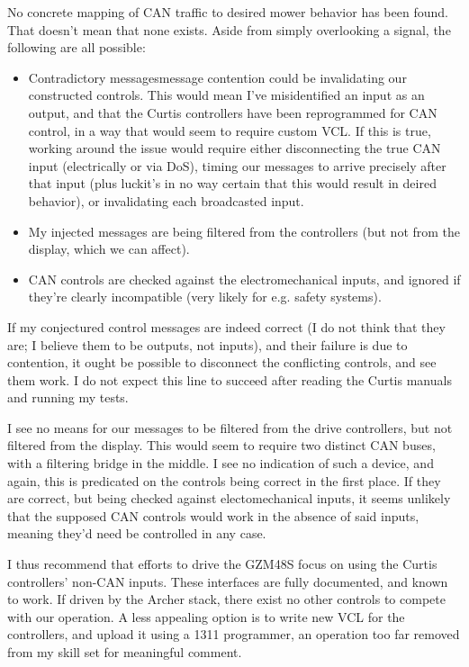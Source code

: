 \documentclass[letterpaper,10pt]{article}
\begin{document}
No concrete mapping of CAN traffic to desired mower behavior has been found.
That doesn't mean that none exists. Aside from simply overlooking a signal,
the following are all possible:
\begin{itemize}
\item Contradictory messages{\textemdash}message contention{\textemdash} could
  be invalidating our constructed controls. This would mean I've misidentified
  an input as an output, and that the Curtis controllers have been reprogrammed
  for CAN control, in a way that would seem to require custom VCL. If this is
  true, working around the issue would require either disconnecting the true
  CAN input (electrically or via DoS), timing our messages to arrive precisely
  after that input (plus luck{\textemdash}it's in no way certain that this
  would result in deired behavior), or invalidating each broadcasted input.
\item My injected messages are being filtered from the controllers (but not
  from the display, which we can affect).
\item CAN controls are checked against the electromechanical inputs, and
  ignored if they're clearly incompatible (very likely for e.g. safety systems).
\end{itemize}

If my conjectured control messages are indeed correct (I do not think that
they are; I believe them to be outputs, not inputs), and their failure is due
to contention, it ought be possible to disconnect the conflicting controls,
and see them work. I do not expect this line to succeed after reading the
Curtis manuals and running my tests.

I see no means for our messages to be filtered from the drive controllers, but
not filtered from the display. This would seem to require two distinct CAN
buses, with a filtering bridge in the middle. I see no indication of such a
device, and again, this is predicated on the controls being correct in the first
place. If they are correct, but being checked against electomechanical inputs,
it seems unlikely that the supposed CAN controls would work in the absence of
said inputs, meaning they'd need be controlled in any case.

I thus recommend that efforts to drive the GZM48S focus on using the Curtis
controllers' non-CAN inputs. These interfaces are fully documented, and known
to work. If driven by the Archer stack, there exist no other controls to
compete with our operation. A less appealing option is to write new VCL for the
controllers, and upload it using a 1311 programmer, an operation too far
removed from my skill set for meaningful comment.
\end{document}

